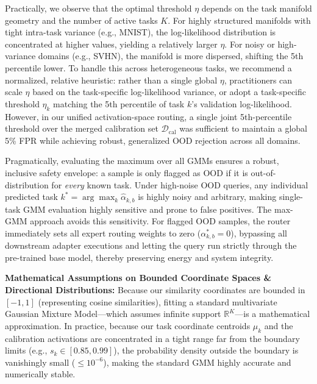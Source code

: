 Practically, we observe that the optimal threshold $\eta$ depends on the task manifold geometry and the number of active tasks $K$. For highly structured manifolds with tight intra-task variance (e.g., MNIST), the log-likelihood distribution is concentrated at higher values, yielding a relatively larger $\eta$. For noisy or high-variance domains (e.g., SVHN), the manifold is more dispersed, shifting the 5th percentile lower. To handle this across heterogeneous tasks, we recommend a normalized, relative heuristic: rather than a single global $\eta$, practitioners can scale $\eta$ based on the task-specific log-likelihood variance, or adopt a task-specific threshold $\eta_k$ matching the 5th percentile of task $k$'s validation log-likelihood. However, in our unified activation-space routing, a single joint 5th-percentile threshold over the merged calibration set $\mathcal{D}_{\text{cal}}$ was sufficient to maintain a global 5\% FPR while achieving robust, generalized OOD rejection across all domains.

Pragmatically, evaluating the maximum over all GMMs ensures a robust, inclusive safety envelope: a sample is only flagged as OOD if it is out-of-distribution for \emph{every} known task. Under high-noise OOD queries, any individual predicted task $k^* = \arg\max_{k} \hat{\alpha}_{k,b}$ is highly noisy and arbitrary, making single-task GMM evaluation highly sensitive and prone to false positives. The max-GMM approach avoids this sensitivity. For flagged OOD samples, the router immediately sets all expert routing weights to zero ($\alpha^*_{k, b} = 0$), bypassing all downstream adapter executions and letting the query run strictly through the pre-trained base model, thereby preserving energy and system integrity.

\textbf{Mathematical Assumptions on Bounded Coordinate Spaces \& Directional Distributions:} Because our similarity coordinates are bounded in $[-1, 1]$ (representing cosine similarities), fitting a standard multivariate Gaussian Mixture Model---which assumes infinite support $\mathbb{R}^K$---is a mathematical approximation. In practice, because our task coordinate centroids $\mu_k$ and the calibration activations are concentrated in a tight range far from the boundary limits (e.g., $s_k \in [0.85, 0.99]$), the probability density outside the boundary is vanishingly small ($\le 10^{-6}$), making the standard GMM highly accurate and numerically stable. 


